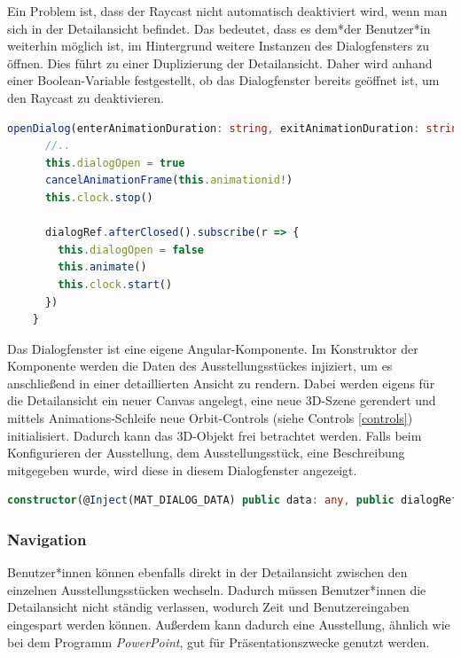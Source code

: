 Ein Problem ist, dass der Raycast nicht automatisch deaktiviert wird, wenn man sich in der Detailansicht befindet. Das bedeutet, dass es dem*der Benutzer*in weiterhin möglich ist, im Hintergrund weitere Instanzen des Dialogfensters zu öffnen. Dies führt zu einer Duplizierung der Detailansicht. Daher wird anhand einer Boolean-Variable festgestellt, ob das Dialogfenster bereits geöffnet ist, um den Raycast zu deaktivieren. 

\begin{lstlisting}[caption={Öffnen und Schließen des Dialogfensters},language=TypeScript]
  openDialog(enterAnimationDuration: string, exitAnimationDuration: string): void {
      //..
      this.dialogOpen = true
      cancelAnimationFrame(this.animationid!)
      this.clock.stop()
  
      dialogRef.afterClosed().subscribe(r => {
        this.dialogOpen = false
        this.animate()
        this.clock.start()
      })
    }
\end{lstlisting}

Das Dialogfenster ist eine eigene Angular-Komponente. Im Konstruktor der Komponente werden die Daten des Ausstellungsstückes injiziert, um es anschließend in einer detaillierten Ansicht zu rendern. Dabei werden eigens für die Detailansicht ein neuer Canvas angelegt, eine neue 3D-Szene gerendert und mittels Animations-Schleife neue Orbit-Controls (siehe Controls \ref{controls}) initialisiert. Dadurch kann das 3D-Objekt frei betrachtet werden. Falls beim Konfigurieren der Ausstellung, dem Ausstellungsstück, eine Beschreibung mitgegeben wurde, wird diese in diesem Dialogfenster angezeigt.

  \begin{lstlisting}[caption={Constructor-Injection in der Dialog Komponente},language=TypeScript]
    constructor(@Inject(MAT_DIALOG_DATA) public data: any, public dialogRef: MatDialogRef<ExhibitDialog>) {}

  \end{lstlisting}

\subsubsection{Navigation}
Benutzer*innen können ebenfalls direkt in der Detailansicht zwischen den einzelnen Ausstellungsstücken wechseln. Dadurch müssen Benutzer*innen die Detailansicht nicht ständig verlassen, wodurch Zeit und Benutzereingaben eingespart werden können. Außerdem kann dadurch eine Ausstellung, ähnlich wie bei dem Programm \emph{PowerPoint}, gut für Präsentationszwecke genutzt werden.  

